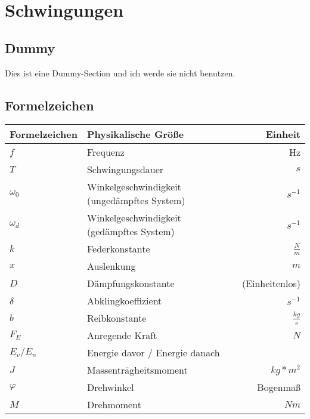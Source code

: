 \documentclass[12pt, a4paper]{scrreprt}
\begin{document}

\tableofcontents
\listoffigures
\newpage
\linespread{1.5} %


\chapter{Schwingungen}

\section{Dummy}
Dies ist eine Dummy-Section und ich werde sie nicht benutzen.

\section{Formelzeichen}

\begin{center}
  \makegapedcells
  \begin{tabular}{l | l | r}
    Formelzeichen & Physikalische Größe & Einheit\\
    \hline \hline
    \(f\) & Frequenz & Hz\\ \hline
    \(T\) & Schwingungsdauer & \(s\)\\ \hline
    \(\omega _0\) & Winkelgeschwindigkeit (ungedämpftes System) & \(s^{-1}\)\\ \hline
    \(\omega _d\) & Winkelgeschwindigkeit (gedämpftes System) & \(s^{-1}\)\\ \hline
    \(k\) & Federkonstante & \(\frac{N}{m}\)\\ \hline
    \(x\) & Auslenkung & \(m\)\\ \hline
    \(D\) & Dämpfungskonstante & (Einheitenlos)\\ \hline
    \(\delta\) & Abklingkoeffizient & \(s^{-1}\)\\ \hline
    \(b\) & Reibkonstante & \(\frac{kg}{s}\)\\ \hline
    \(F_E\) & Anregende Kraft & \(N\)\\ \hline
    \(E_v/E_n\) & Energie davor / Energie danach\\ \hline
    \(J\) & Massenträgheitsmoment & \(kg*m^2\)\\ \hline
    \(\varphi\) & Drehwinkel & Bogenmaß\\ \hline
    \(M\) & Drehmoment & \(Nm\)\\ \hline
  \end{tabular}
\end{center}
\end{document}

